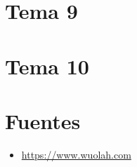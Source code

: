 \documentclass[a4paper,12pt]{article}
\begin{document}
\section{Tema 9}


\section{Tema 10}




% 

% 

% 

% 

% 

% 

% 

% 

% 

% 

\section{Fuentes}

\begin{itemize}
    \item \url{https://www.wuolah.com}
\end{itemize}
\end{document}

